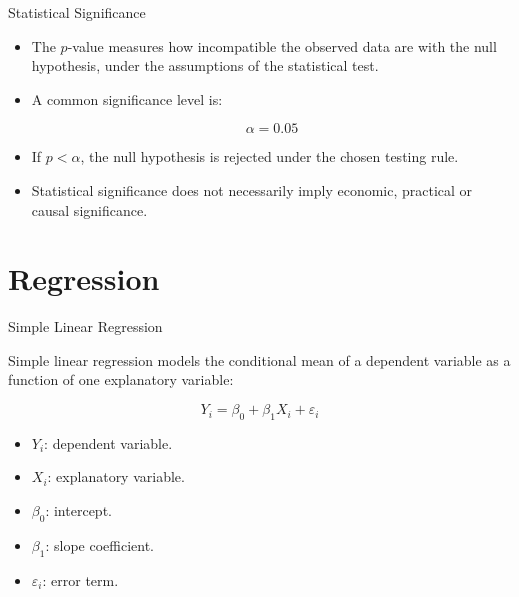 \documentclass{beamer}
\begin{document}
\begin{frame}{Statistical Significance}

\begin{itemize}

  \item The $p$-value measures how incompatible the observed data are with the null hypothesis, under the assumptions of the statistical test.

  \vskip 0.4cm

  \item A common significance level is:

\[
\alpha = 0.05
\]

  \vskip 0.4cm

  \item If $p < \alpha$, the null hypothesis is rejected under the chosen testing rule.

  \vskip 0.4cm

  \item Statistical significance does not necessarily imply economic, practical or causal significance.

\end{itemize}

\end{frame}



\section{Regression}

\begin{frame}{Simple Linear Regression}

Simple linear regression models the conditional mean of a dependent variable as a function of one explanatory variable:

\vskip 0.5cm

\[
Y_i =
\beta_0 +
\beta_1 X_i +
\varepsilon_i
\]

\vskip 0.5cm

\begin{itemize}

  \item $Y_i$: dependent variable.

  \item $X_i$: explanatory variable.

  \item $\beta_0$: intercept.

  \item $\beta_1$: slope coefficient.

  \item $\varepsilon_i$: error term.

\end{itemize}

\end{frame}
\end{document}
